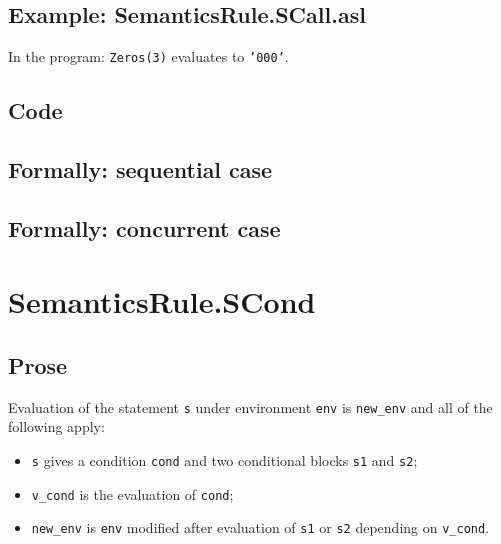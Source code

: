 \documentclass{book}
\begin{document}
    \subsection{Example: SemanticsRule.SCall.asl}
    In the program:
    \texttt{Zeros(3)} evaluates to \texttt{'000'}.

  \subsection{Code}

\begin{emptyformal}
  \subsection{Formally: sequential case}

  \subsection{Formally: concurrent case}
\end{emptyformal}


\section{SemanticsRule.SCond \label{sec:SemanticsRule.SCond}}

    \subsection{Prose}
  Evaluation of the statement \texttt{s} under environment \texttt{env} is
\texttt{new\_env} and all of the following apply:
    \begin{itemize}
    \item \texttt{s} gives a condition \texttt{cond} and two conditional blocks \texttt{s1} and \texttt{s2};
    \item \texttt{v\_cond} is the evaluation of \texttt{cond};
    \item \texttt{new\_env} is \texttt{env} modified after evaluation of \texttt{s1} or \texttt{s2} depending on
      \texttt{v\_cond}.
    \end{itemize}
\end{document}
